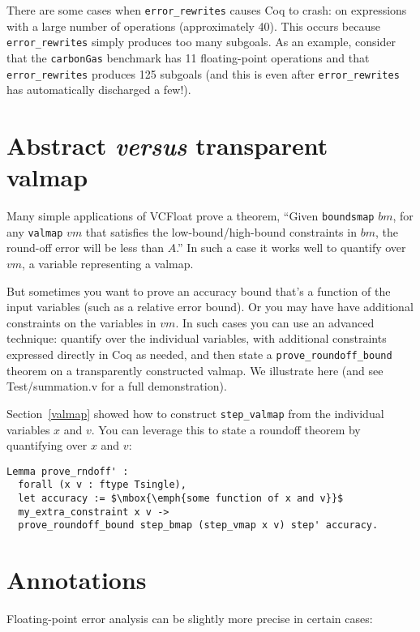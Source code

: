 \documentclass[article]{memoir}
\begin{document}
There are some cases when \lstinline{error_rewrites} causes Coq 
to crash: on expressions with a large number of operations 
(approximately 40). This occurs because 
\lstinline{error_rewrites} simply produces too many subgoals. 
As an example, consider that the 
\lstinline{carbonGas} benchmark has 11 floating-point 
operations and that \lstinline{error_rewrites} produces 125 
subgoals (and this is even after \lstinline{error_rewrites} has 
automatically discharged a few!). 

\chapter{Abstract \emph{versus} transparent valmap}

Many simple applications of VCFloat prove a theorem,
``Given \lstinline{boundsmap} $\mathit{bm}$,
for any \lstinline{valmap} $\mathit{vm}$ that satisfies the
low-bound/high-bound constraints in $\mathit{bm}$,
the round-off error will be less than $A$.''
In such a case it works well to quantify over $\mathit{vm}$,
a variable representing a valmap.

But sometimes you want to prove an accuracy bound that's
a function of the input variables (such as a relative error bound).
Or you may have have additional constraints on the variables
in $\mathit{vm}$.
In such cases you can use an advanced technique:
quantify over the individual variables, with additional constraints
expressed directly in Coq as needed, and then state a
\lstinline{prove_roundoff_bound} theorem on a transparently
constructed valmap.  We illustrate here (and see Test/summation.v
for a full demonstration).

Section~\ref{valmap} showed how to construct \lstinline{step_valmap}
from the individual variables $x$ and $v$.  You can leverage this
to state a roundoff theorem by quantifying over $x$ and $v$:
\begin{lstlisting}
Lemma prove_rndoff' :
  forall (x v : ftype Tsingle),
  let accuracy := $\mbox{\emph{some function of x and v}}$
  my_extra_constraint x v ->   
  prove_roundoff_bound step_bmap (step_vmap x v) step' accuracy.
\end{lstlisting}  

\chapter{Annotations}

Floating-point error analysis can be slightly more precise
in certain cases:
\end{document}
